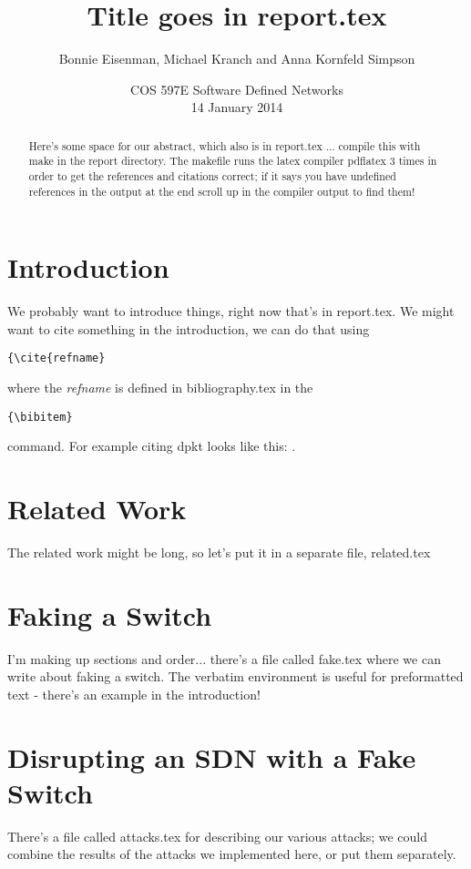 \documentclass[12pt, letterpaper, twoside]{article}
\title{Title goes in report.tex}
\author{Bonnie Eisenman, Michael Kranch and Anna Kornfeld Simpson}
\date{COS 597E Software Defined Networks \\ 14 January 2014}
\begin{document}
\maketitle

\begin{spacing}{1.0}

\begin{abstract}
Here's some space for our abstract, which also is in report.tex ... compile this with make in the report directory.  The makefile runs the latex compiler pdflatex 3 times in order to get the references and citations correct; if it says you have undefined references in the output at the end scroll up in the compiler output to find them!
\end{abstract}

\begin{multicols}{2}

\section{Introduction}
We probably want to introduce things, right now that's in report.tex.  We might want to cite something in the introduction, we can do that using \begin{verbatim}{\cite{refname}\end{verbatim} where the \emph{refname} is defined in bibliography.tex in the \begin{verbatim}{\bibitem}\end{verbatim} command.  For example citing dpkt looks like this: \cite{dpkt}.

\section{Related Work}
\label{related}
The related work might be long, so let's put it in a separate file, related.tex


\section{Faking a Switch}
\label{fake}
I'm making up sections and order... there's a file called fake.tex where we can write about faking a switch. The verbatim environment is useful for preformatted text - there's an example in the introduction!


\section{Disrupting an SDN with a Fake Switch}
\label{attacks}
There's a file called attacks.tex for describing our various attacks; we could combine the results of the attacks we implemented here, or put them separately.



\end{multicols}
\end{spacing}
\end{document}
